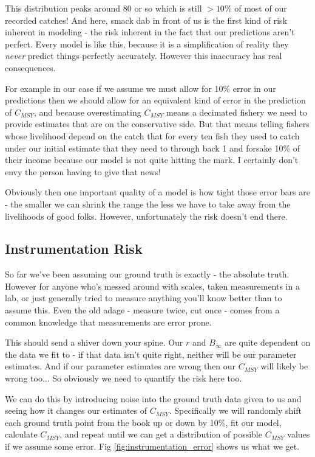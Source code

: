 \documentclass[11pt,a5paper]{book}
\begin{document}
This distribution peaks around 80 or so which is still $>10\%$ of most of our recorded catches! And here, smack dab in front of us is the first kind of risk inherent in modeling - the risk inherent in the fact that our predictions aren't perfect. Every model is like this, because it is a simplification of reality they \textit{never} predict things perfectly accurately. However this inaccuracy has real consequences. 
\newline

For example in our case if we assume we must allow for 10\% error in our predictions then we should allow for an equivalent kind of error in the prediction of $C_{MSY}$, and because overestimating $C_{MSY}$ means a decimated fishery we need to provide estimates that are on the conservative side. But that means telling fishers whose livelihood depend on the catch that for every ten fish they used to catch under our initial estimate that they need to through back 1 and forsake 10\% of their income because our model is not quite hitting the mark. I certainly don't envy the person having to give that news! 
\newline

Obviously then one important quality of a model is how tight those error bars are - the smaller we can shrink the range the less we have to take away from the livelihoods of good folks. However, unfortunately the risk doesn't end there. 

\subsection{Instrumentation Risk}

So far we've been assuming our ground truth is exactly - the absolute truth. However for anyone who's messed around with scales, taken measurements in a lab, or just generally tried to measure anything you'll know better than to assume this. Even the old adage - measure twice, cut once - comes from a common knowledge that measurements are error prone. 
\newline

This should send a shiver down your spine. Our $r$ and $B_\infty$ are quite dependent on the data we fit to - if that data isn't quite right, neither will be our parameter estimates. And if our parameter estimates are wrong then our $C_{MSY}$ will likely be wrong too... So obviously we need to quantify the risk here too. 
\newline

We can do this by introducing noise into the ground truth data given to us and seeing how it changes our estimates of $C_{MSY}$. Specifically we will randomly shift each ground truth point from the book up or down by 10\%, fit our model, calculate $C_{MSY}$, and repeat until we can get a distribution of possible $C_{MSY}$ values if we assume some error. Fig \ref{fig:instrumentation_error} shows us what we get.
\newline
\end{document}
